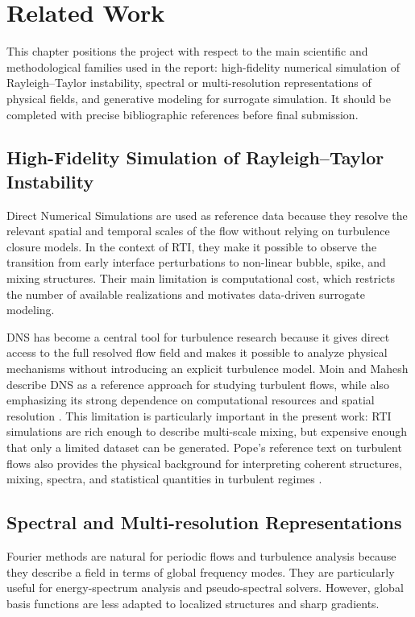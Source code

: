 ﻿\chapter{Related Work}
\label{chap:related-work}

This chapter positions the project with respect to the main scientific and methodological families used in the report: high-fidelity numerical simulation of Rayleigh--Taylor instability, spectral or multi-resolution representations of physical fields, and generative modeling for surrogate simulation. It should be completed with precise bibliographic references before final submission.

\section{High-Fidelity Simulation of Rayleigh--Taylor Instability}

Direct Numerical Simulations are used as reference data because they resolve the relevant spatial and temporal scales of the flow without relying on turbulence closure models. In the context of RTI, they make it possible to observe the transition from early interface perturbations to non-linear bubble, spike, and mixing structures. Their main limitation is computational cost, which restricts the number of available realizations and motivates data-driven surrogate modeling.

DNS has become a central tool for turbulence research because it gives direct
access to the full resolved flow field and makes it possible to analyze
physical mechanisms without introducing an explicit turbulence model. Moin and
Mahesh describe DNS as a reference approach for studying turbulent flows, while
also emphasizing its strong dependence on computational resources and spatial
resolution \citep{MoinMahesh1998}. This limitation is particularly important in
the present work: RTI simulations are rich enough to describe multi-scale
mixing, but expensive enough that only a limited dataset can be generated.
Pope's reference text on turbulent flows also provides the physical background
for interpreting coherent structures, mixing, spectra, and statistical
quantities in turbulent regimes \citep{pope2000turbulent}.

\section{Spectral and Multi-resolution Representations}

Fourier methods are natural for periodic flows and turbulence analysis because they describe a field in terms of global frequency modes. They are particularly useful for energy-spectrum analysis and pseudo-spectral solvers. However, global basis functions are less adapted to localized structures and sharp gradients.

